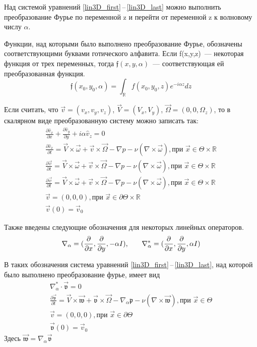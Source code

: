Над системой уравнений \ref{lin3D_first}\,--\,\ref{lin3D_last} можно выполнить преобразование Фурье по переменной z и перейти от переменной z к волновому числу $\alpha$.

Функции, над которыми было выполнено преобразование Фурье, обозначены соответствующими буквами готического алфавита. Если f(x,y,z)~--- некоторая функция от трех переменных, тогда $ \mathfrak{f}(x,y,\alpha) $~--- соответствующая ей преобразованная функция.
$$
 \mathfrak{f}(x_0,y_0,\alpha) = \int_\mathbb{R} f(x_0,y_0,z) e^{-i\alpha z} dz 
$$

Если считать, что $\vec v = (v_x, v_y, v_z)$, $\vec V = (V_x, V_y)$, $\vec \Omega = (0, 0, \Omega_z)$, то в скалярном виде преобразованную систему можно записать так:
\begin{gather} 
  \label{scalar3D_first}
 \frac{\partial \hat v_x}{\partial x} + \frac{\partial \hat v_y}{\partial y} + i\alpha \hat v_z= 0\\
% 
 \frac{\partial \hat v_x}{\partial t} = \vec V \times \vec \omega + \vec v \times \vec \Omega - \nabla p - \nu ( \nabla \times \vec \omega ), \text{при } \vec x \in \Theta \times \mathbb{R}\\
% 
 \frac{\partial \vec v}{\partial t} = \vec V \times \vec \omega + \vec v \times \vec \Omega - \nabla p - \nu ( \nabla \times \vec \omega ), \text{при } \vec x \in \Theta \times \mathbb{R}\\
% 
 \frac{\partial \vec v}{\partial t} = \vec V \times \vec \omega + \vec v \times \vec \Omega - \nabla p - \nu ( \nabla \times \vec \omega ), \text{при } \vec x \in \Theta \times \mathbb{R}\\
% 
 \vec v = (0,0,0), \text{при } \vec x \in \partial \Theta \times \mathbb{R} \\
 \vec v (0) = \vec v _0 
  \label{scalar3D_last}
\end{gather}
\fi

Также введены следующие обозначения для некоторых линейных операторов.
$$
  \nabla_\alpha = (\frac{\partial}{\partial x},\frac{\partial}{\partial y},-\alpha I)\text{,\qquad} 
  \nabla_\alpha^* = (\frac{\partial}{\partial x},\frac{\partial}{\partial y},\alpha I) 
$$

В таких обозначения система уравнений \ref{lin3D_first}\,--\,\ref{lin3D_last}, над которой было выполнено преобразование фурье, имеет вид
\begin{gather} 
  \label{ft3D_first}
  \nabla_\alpha^* \cdot  \mathfrak{\vec v} = 0\\
  \frac{\partial \mathfrak{\vec v}}{\partial t} = \vec V \times \mathfrak{\vec w} + \mathfrak{\vec v} \times \vec \Omega - 
		\nabla_\alpha \mathfrak{p} - \nu ( \nabla \times \mathfrak{\vec w} ), \text{при } \vec x \in \Theta\\
  \vec v = (0,0,0), \text{при } \vec x \in \partial \Theta\\
  \mathfrak{\vec v} (0) = \vec v _0 \label{ft3D_last}
\end{gather}
Здесь $\mathfrak{\vec w} = \nabla_\alpha \mathfrak{\vec v}$ 

